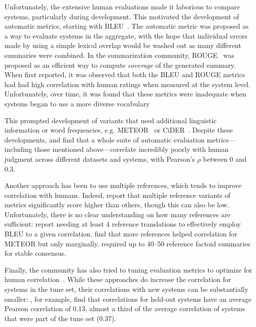 Unfortunately, the extensive human evaluations made it laborious to compare systems, particularly during development.
This motivated the development of automatic metrics, starting with BLEU~\citep{papineni02bleu}.
The automatic metric was proposed as a way to evaluate systems in the aggregate, with the hope that individual errors made by using a simple lexical overlap would be washed out as many different summaries were combined.
In the summarization community, ROUGE~\citep{lin2004rouge} was proposed as an efficient way to compute \textit{coverage} of the generated summary.
When first reported, it was observed that both the BLEU and ROUGE metrics had had high correlation with human ratings when measured at the system level.
Unfortunately, over time, it was found that these metrics were inadequate when systems began to use a more diverse vocabulary~\citep{lavie2009meteor,cohan2016revisiting}

This prompted development of variants that used additional linguistic information or word frequencies, e.g. METEOR~\citep{lavie2009meteor,denkowski2014meteor} or CiDER~\citep{vedantam2015cider}.
Despite these developments, \citet{liu2016evaluate} and \citet{novikova2017why} find that a whole suite of automatic evaluation metrics---including those mentioned above---correlate incredibly poorly with human judgment across different datasets and systems, with Pearson's $\rho$ between $0$ and $0.3$.

Another approach has been to use multiple references, which tends to improve correlation with humans.
Indeed, \citet{toutanova2016dataset} report that multiple reference variants of metrics significantly score higher than others, though this can also be low.
Unfortunately, there is no clear understanding on how many references are sufficient: 
  \citet{culy2003limits} report needing at least 4 reference translations to effectively employ BLEU to a given correlation.
  \citet{lavie2009meteor} find that more references helped correlation for METEOR but only marginally.
\citet{vanhalteren2003factoid} required up to 40--50 reference factoid summaries for stable consensus.

Finally, the community has also tried to tuning evaluation metrics to optimize for human correlation~\citep{lavie2009meteor,denkowski2014meteor,lowe2017towards}.
While these approaches do increase the correlation for systems in the tune set, their correlations with new systems can be substantially smaller: \citet{lowe2017towards}, for example, find that correlations for held-out systems have an average Pearson correlation of $0.13$, almost a third of the average correlation of systems that were part of the tune set ($0.37$).

